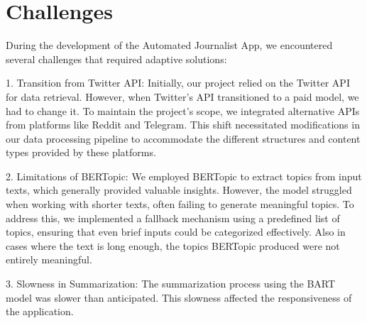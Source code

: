 \section{Challenges}\label{sec:challenges}

During the development of the Automated Journalist App, we encountered several challenges that required adaptive solutions:

1. Transition from Twitter API: Initially, our project relied on the Twitter API for data retrieval. However, when Twitter's API transitioned to a paid model, we had to change it. To maintain the project's scope, we integrated alternative APIs from platforms like Reddit and Telegram. This shift necessitated modifications in our data processing pipeline to accommodate the different structures and content types provided by these platforms.

2. Limitations of BERTopic: We employed BERTopic to extract topics from input texts, which generally provided valuable insights. However, the model struggled when working with shorter texts, often failing to generate meaningful topics. To address this, we implemented a fallback mechanism using a predefined list of topics, ensuring that even brief inputs could be categorized effectively. Also in cases where the text is long enough, the topics BERTopic produced were not entirely meaningful.

3.	Slowness in Summarization: The summarization process using the BART model was slower than anticipated. This slowness affected the responsiveness of the application.